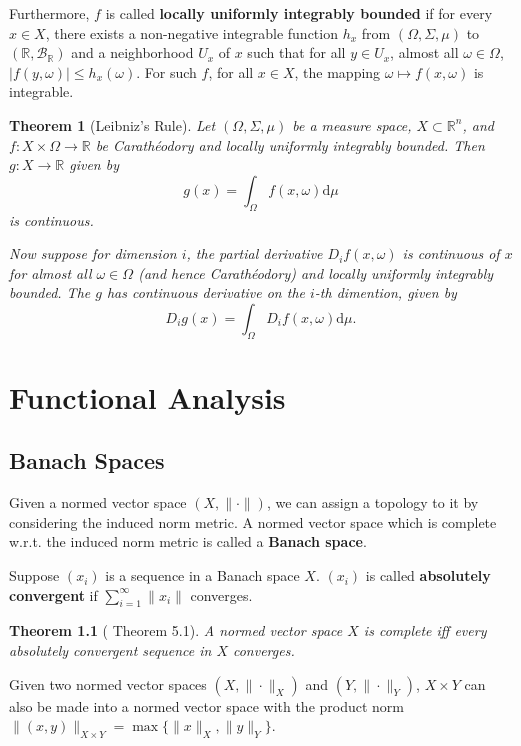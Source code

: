 \documentclass[openany]{book}
\newtheorem{theorem}{Theorem}[chapter]
\theoremstyle{definition}
\theoremstyle{remark}
\begin{document}
Furthermore, $f$ is called \textbf{locally uniformly integrably bounded} if for every $x\in X$, there exists a non-negative integrable function $h_x$ from $(\Omega,\Sigma,\mu)$ to $(\mathbb{R},\mathcal{B}_{\mathbb{R}})$ and a neighborhood $U_x$ of $x$ such that for all $y\in U_x$, almost all $\omega\in\Omega$, $|f(y,\omega)|\le h_x(\omega)$. For such $f$, for all $x\in X$, the mapping $\omega\mapsto f(x,\omega)$ is integrable.
\begin{theorem}[Leibniz's Rule]
    Let $(\Omega,\Sigma,\mu)$ be a measure space, $X\subset \mathbb{R}^n$, and $f:X\times\Omega\to \mathbb{R}$ be Carath\'{e}odory and locally uniformly integrably bounded. Then $g:X\to \mathbb{R}$ given by
    \begin{equation*}
        g(x)=\int_{\Omega} f(x,\omega)\mathrm{d}\mu
    \end{equation*}
    is continuous.

    Now suppose for dimension $i$, the partial derivative $D_if(x,\omega)$ is continuous of $x$ for almost all $\omega\in\Omega$ (and hence Carath\'{e}odory) and locally uniformly integrably bounded. The $g$ has continuous derivative on the $i$-th dimention, given by
    \begin{equation*}
        D_ig(x)=\int_{\Omega}D_if(x,\omega)\mathrm{d}\mu.
    \end{equation*}
\end{theorem}

\chapter{Functional Analysis}
\section{Banach Spaces}
Given a normed vector space $(X,\|\cdot\|)$, we can assign a topology to it by considering the induced norm metric. A normed vector space which is complete w.r.t. the induced norm metric is called a \textbf{Banach space}.

Suppose $(x_i)$ is a sequence in a Banach space $X$. $(x_i)$ is called \textbf{absolutely convergent} if $\sum_{i=1}^{\infty}\|x_i\|$ converges.
\begin{theorem}[\cite{F13} Theorem 5.1]
    A normed vector space $X$ is complete iff every absolutely convergent sequence in $X$ converges.
\end{theorem}

Given two normed vector spaces $(X,\|\cdot\|_X)$ and $(Y,\|\cdot\|_Y)$, $X\times Y$ can also be made into a normed vector space with the product norm $\|(x,y)\|_{X\times Y}=\max\{\|x\|_X,\|y\|_Y\}$.
\end{document}
